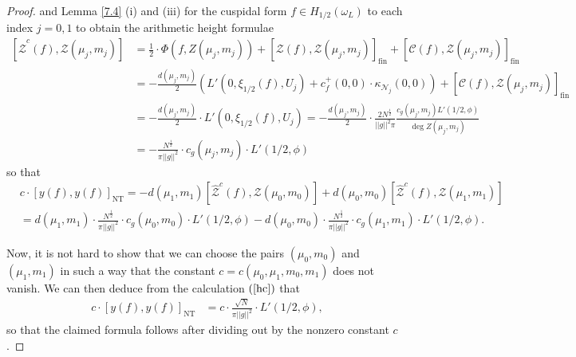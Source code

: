\documentclass{amsart}
\theoremstyle{definition}
\theoremstyle{definition}
\theoremstyle{definition}
\begin{document}
\begin{proof}
and Lemma \ref{7.4} (i) and (iii) for the cuspidal form $f \in H_{1/2}(\omega_L)$ to each index $j=0,1$ to obtain the arithmetic height formulae 
\begin{equation*}\begin{aligned} \left[ \widehat{\mathcal{Z}}^c(f), \mathcal{Z}(\mu_j, m_j) \right] 
&= \frac{1}{2} \cdot \Phi(f, Z(\mu_j, m_j)) + \left[ \mathcal{Z}(f), \mathcal{Z}(\mu_j, m_j) \right]_{\operatorname{fin}} 
+ \left[ \mathcal{C}(f), \mathcal{Z}(\mu_j, m_j) \right]_{\operatorname{fin}} \\
&= - \frac{d(\mu_j, m_j)}{2} \left( L'(0, \xi_{1/2}(f), U_j) + c_f^+(0,0) \cdot \kappa_{\mathcal{N}_j}(0,0) \right) 
+ \left[ \mathcal{C}(f), \mathcal{Z}(\mu_j, m_j) \right]_{\operatorname{fin}} \\ 
&= - \frac{d(\mu_j, m_j)}{2} \cdot L'(0, \xi_{1/2}(f), U_j) 
= - \frac{d(\mu_j, m_j)}{2 } \cdot \frac{ 2 N^{\frac{1}{2}} }{\vert \vert g \vert \vert^2 \pi}  \frac{c_g(\mu_j, m_j) L'(1/2, \phi)}{\deg Z(\mu_j, m_j)} \\
&= - \frac{ N^{\frac{1}{2}} }{ \pi \vert \vert g \vert \vert^2 } \cdot c_g(\mu_j, m_j) \cdot L'(1/2, \phi) \end{aligned}\end{equation*}
so that 
\begin{equation}\begin{aligned}\label{hc} &c \cdot \left[ y(f), y(f) \right]_{\operatorname{NT}} 
=  - d(\mu_1, m_1) \left[ \widehat{\mathcal{Z}}^c(f), \mathcal{Z}(\mu_0, m_0) \right] 
+ d(\mu_0, m_0) \left[ \widehat{\mathcal{Z}}^c(f), \mathcal{Z}( \mu_1, m_1) \right] \\
&=   d(\mu_1, m_1) \cdot \frac{ N^{\frac{1}{2}} }{  \pi \vert \vert g \vert \vert^2 } \cdot c_g(\mu_0, m_0) \cdot L'(1/2, \phi)
- d(\mu_0, m_0) \cdot \frac{ N^{ \frac{1}{2} } }{  \pi \vert \vert g \vert \vert^2} 
\cdot c_g(\mu_1, m_1) \cdot L'(1/2, \phi).\end{aligned}\end{equation}

Now, it is not hard to show that we can choose the pairs $(\mu_0, m_0)$ and $(\mu_1, m_1)$ in such a way that the constant 
$c = c(\mu_0, \mu_1, m_0, m_1)$ does not vanish. We can then deduce from the calculation $(\ref{hc})$ that 
\begin{align*} c \cdot \left[ y(f), y(f) \right]_{\operatorname{NT}} 
&= c \cdot \frac{\sqrt{N}}{ \pi \vert \vert g \vert \vert^2} \cdot L'(1/2, \phi), \end{align*}
so that the claimed formula follows after dividing out by the nonzero constant $c$. \end{proof} 
\end{document}
